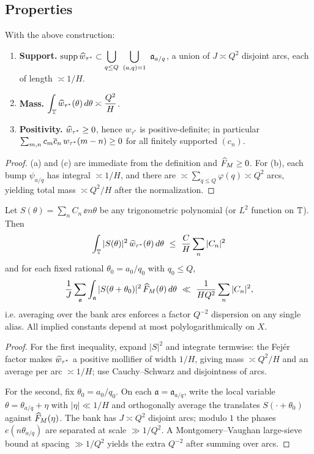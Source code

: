 \subsection{Properties}
\begin{proposition}\label{prop:tfa-basic}
With the above construction:
\begin{enumerate}[label=(\alph*),leftmargin=2em]
  \item \textbf{Support.} $\operatorname{supp}\widehat w_{\tau^\ast}\subset \displaystyle\bigcup_{q\le Q}\ \bigcup_{(a,q)=1}\ \mathfrak a_{a/q}$, a union of $J\asymp Q^2$ disjoint arcs, each of length $\asymp 1/H$.
  \item \textbf{Mass.} $\displaystyle \int_{\mathbb{T}}\widehat w_{\tau^\ast}(\theta)\,d\theta \asymp \frac{Q^2}{H}$.
  \item \textbf{Positivity.} $\widehat w_{\tau^\ast}\ge 0$, hence $w_{\tau^\ast}$ is positive-definite; in particular $\sum_{m,n}c_m\overline{c}_n\,w_{\tau^\ast}(m-n)\ge 0$ for all finitely supported $(c_n)$.
\end{enumerate}
\end{proposition}

\begin{proof}
(a) and (c) are immediate from the definition and $\widehat F_M\ge 0$. For (b), each bump $\psi_{a/q}$ has integral $\asymp 1/H$, and there are $\asymp \sum_{q\le Q}\varphi(q)\asymp Q^2$ arcs, yielding total mass $\asymp Q^2/H$ after the normalization.
\end{proof}

\begin{proposition}[Alias suppression, $\delta=2$]\label{prop:tfa-suppress}
Let $S(\theta)=\sum_{n} C_n\,\ee{n\theta}$ be any trigonometric polynomial (or $L^2$ function on $\mathbb{T}$). Then
\[
\int_{\mathbb{T}} |S(\theta)|^2\,\widehat w_{\tau^\ast}(\theta)\,d\theta
\ \le\ \frac{C}{H}\sum_{n}|C_n|^2
\]
and for each fixed rational $\theta_0=a_0/q_0$ with $q_0\le Q$,
\[
\frac{1}{J}\sum_{\mathfrak a}\int_{\mathfrak a} |S(\theta+\theta_0)|^2\,\widehat F_M(\theta)\,d\theta
\ \ll\ \frac{1}{H Q^2}\sum_{n}|C_n|^2,
\]
i.e. averaging over the bank arcs enforces a factor $Q^{-2}$ dispersion on any single alias. All implied constants depend at most polylogarithmically on $X$.
\end{proposition}

\begin{proof}[Proof]
For the first inequality, expand $|S|^2$ and integrate termwise: the Fej\'er factor makes $\widehat w_{\tau^\ast}$ a positive mollifier of width $1/H$, giving mass $\asymp Q^2/H$ and an average per arc $\asymp 1/H$; use Cauchy--Schwarz and disjointness of arcs.

For the second, fix $\theta_0=a_0/q_0$. On each $\mathfrak a=\mathfrak a_{a/q}$, write the local variable $\theta=\theta_{a/q}+\eta$ with $|\eta|\ll 1/H$ and orthogonally average the translates $S(\cdot+\theta_0)$ against $\widehat F_M(\eta)$. The bank has $J\asymp Q^2$ disjoint arcs; modulo $1$ the phases $e(n\theta_{a/q})$ are separated at scale $\gg 1/Q^2$. A Montgomery--Vaughan large-sieve bound at spacing $\gg 1/Q^2$ yields the extra $Q^{-2}$ after summing over arcs.
\end{proof}


